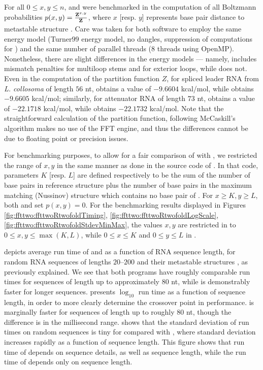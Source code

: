 For all $0 \leq x,y \leq n$, \rnatwofold and \ffttwo were
benchmarked in the computation of all Boltzmann probabilities
$p(x,y)= \frac{{\bf Z}^{x,y}_{}}{{\bf Z}^{}_{}}$, where $x$ [resp. $y$] represents base pair
distance to metastable structure . Care was taken for
both software to employ the same energy model (Turner$99$ energy model,
no dangles, suppression of \mfes computations
for \rnatwofold) and the same number of parallel threads (8 threads
using OpenMP). Nonetheless, there are slight differences in the energy
models --- namely, \rnatwofold includes
mismatch penalties for multiloop stems and for exterior loops, while
\ffttwo does not. Even in the computation of the partition function
$Z$, for spliced leader RNA from {\em L. collosoma} of length $56$ nt,
\rnatwofold {} obtains a value of
$-9.6604$ kcal/mol, while \ffttwo obtains
$-9.6605$ kcal/mol; similarly, for attenuator RNA of length $73$ nt,
\rnatwofold {} obtains a value of
$-22.1718$ kcal/mol, while \ffttwo obtains
$-22.1732$ kcal/mol.
Note that the straightforward calculation of the partition function, following McCaskill's algorithm \citep{mccaskill} makes no use of the FFT engine, and thus the differences cannot be due to floating point or precision issues.

For benchmarking purposes,
to allow for a fair comparison of \ffttwo
with \rnatwofold, we restricted the range of $x,y$ in the same manner as done in the source code of \rnatwofold.
In that code, parameters $K$ [resp. $L$] are defined respectively to be the
sum of the number of base pairs in reference structure  plus the number of base pairs in
the maximum matching (Nussinov) structure which contains
no base pair of .
For $x \geq K, y \geq L$, both \rnatwofold and \ffttwo
set $p(x,y)=0$.  For the benchmarking results displayed in
Figures \ref{fig:ffttwo:ffttwoRtwofoldTiming},
\ref{fig:ffttwo:ffttwoRtwofoldLogScale},
\ref{fig:ffttwo:ffttwoRtwofoldStdevMinMax},
the values $x,y$ are restricted in
\ffttwo to $0 \leq x,y \leq \max(K,L)$, while $0 \leq x \leq K$
and $0 \leq y \leq L$ in \rnatwofold.

 depicts average run time of \rnatwofold
and \ffttwo as a function of RNA sequence length, for random RNA
sequences of lengths $20$--$200$ and their metastable structures \strAB, as
previously explained.  We see that both programs have
roughly comparable run times for sequences of length up to approximately
$80$ nt, while \ffttwo is demonstrably faster for longer sequences.
presents $\log_{10}$ run time as a function of sequence length, in order
to more clearly determine the crossover point in performance.
\rnatwofold is marginally faster for sequences of
length up to roughly $80$ nt, though the difference is in the millisecond
range.
shows that the standard deviation of run times on random sequences is
tiny for \ffttwo compared with \rnatwofold, where standard
deviation increases rapidly as a function of sequence length. This figure
shows that run time of \rnatwofold depends on sequence details, as
well as sequence length, while the run time of \ffttwo depends only
on sequence length.

